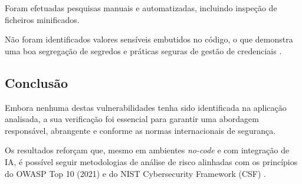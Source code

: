Foram efetuadas pesquisas manuais e automatizadas, incluindo inspeção de ficheiros minificados.

Não foram identificados valores sensíveis embutidos no código, o que demonstra uma boa segregação de segredos e práticas seguras de gestão de credenciais \cite{ref14, ref15}.

\subsection{Conclusão}

Embora nenhuma destas vulnerabilidades tenha sido identificada na aplicação analisada, a sua verificação foi essencial para garantir uma abordagem responsável, abrangente e conforme as normas internacionais de segurança.

Os resultados reforçam que, mesmo em ambientes \textit{no-code} e com integração de IA, é possível seguir metodologias de análise de risco alinhadas com os princípios do OWASP Top 10 (2021) e do NIST Cybersecurity Framework (CSF) \cite{ref2, ref4}.
